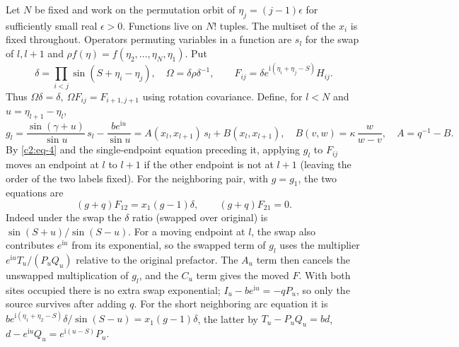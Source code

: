 Let \(N\) be fixed and work on the permutation orbit of \(\eta_j=(j-1)\epsilon\) for sufficiently small real \(\epsilon>0\). Functions live on \(N!\) tuples. The multiset of the $x_i$ is fixed throughout. Operators permuting variables in a function are \(s_l\) for the swap of \(l,l+1\) and \(\rho f(\eta)=f(\eta_2,\ldots,\eta_N,\eta_1)\). Put
\[
 \delta=\prod_{i<j}\sin(S+\eta_i-\eta_j),\quad \Omega=\delta\rho\delta^{-1},\qquad
 F_{ij}=\delta e^{\mathrm i(\eta_i+\eta_j-S)} H_{ij}.
\]
Thus \(\Omega\delta=\delta,\ \Omega F_{ij}=F_{i+1,j+1}\) using rotation covariance. Define, for \(l<N\) and \(u=\eta_{l+1}-\eta_l\),
\[
 g_l=\frac{\sin(\gamma+u)}{\sin u}\,s_l-\frac{b e^{\mathrm i u}}{\sin u}
 =A(x_l,x_{l+1})\,s_l+B(x_l,x_{l+1}),
 \quad B(v,w)=\kappa\,\frac w{w-v},\quad A=q^{-1}-B .
\]
By \eqref{c2:eq-4} and the single-endpoint equation preceding it,
applying $g_l$ to \(F_{ij}\) moves an endpoint at \(l\) to \(l+1\) if the other endpoint is not at \(l+1\) (leaving the order of the two labels fixed).
For the neighboring pair, with $g=g_1$, the two equations are
\begin{equation}
 (g+q)F_{12}=x_1(g-1)\delta,\qquad (g+q)F_{21}=0.                    \label{c2:eq-5}
\end{equation}
Indeed under the swap the \(\delta\) ratio (swapped over original) is \(\sin(S+u)/\sin(S-u)\). For a moving endpoint at \(l\), the swap also contributes \(e^{\mathrm i u}\) from its exponential, so the swapped term of \(g_l\) uses the multiplier \(e^{\mathrm i u}T_u/(P_u Q_u)\) relative to the original prefactor. The \(A_u\) term then cancels the unswapped multiplication of \(g_l\), and the \(C_u\) term gives the moved \(F\). With both sites occupied there is no extra swap exponential; \(I_u-be^{\mathrm i u}=-qP_u\), so only the source survives after adding \(q\). For the short neighboring arc equation it is
\(b e^{\mathrm i(\eta_1+\eta_2-S)}\delta/\sin(S-u)=x_1(g-1)\delta\), the latter by \(T_u-P_u Q_u=bd\), \(d-e^{\mathrm i u} Q_u=e^{\mathrm i(u-S)}P_u\).

